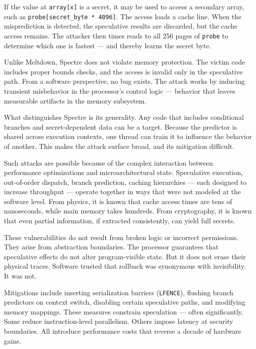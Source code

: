 If the value at \texttt{array[x]} is a secret, it may be used to access a secondary array, such as \texttt{probe[secret\_byte * 4096]}. The access loads a cache line. When the misprediction is detected, the speculative results are discarded, but the cache access remains. The attacker then times reads to all 256 pages of \texttt{probe} to determine which one is fastest — and thereby learns the secret byte.

Unlike Meltdown, Spectre does not violate memory protection. The victim code includes proper bounds checks, and the access is invalid only in the speculative path. From a software perspective, no bug exists. The attack works by inducing transient misbehavior in the processor’s control logic — behavior that leaves measurable artifacts in the memory subsystem.

What distinguishes Spectre is its generality. Any code that includes conditional branches and secret-dependent data can be a target. Because the predictor is shared across execution contexts, one thread can train it to influence the behavior of another. This makes the attack surface broad, and its mitigation difficult.

Such attacks are possible because of the complex interaction between performance optimizations and microarchitectural state. Speculative execution, out-of-order dispatch, branch prediction, caching hierarchies — each designed to increase throughput — operate together in ways that were not modeled at the software level. From physics, it is known that cache access times are tens of nanoseconds, while main memory takes hundreds. From cryptography, it is known that even partial information, if extracted consistently, can yield full secrets.

These vulnerabilities do not result from broken logic or incorrect permissions. They arise from abstraction boundaries. The processor guarantees that speculative effects do not alter program-visible state. But it does not erase their physical traces. Software trusted that rollback was synonymous with invisibility. It was not.

Mitigations include inserting serialization barriers (\texttt{LFENCE}), flushing branch predictors on context switch, disabling certain speculative paths, and modifying memory mappings. These measures constrain speculation — often significantly. Some reduce instruction-level parallelism. Others impose latency at security boundaries. All introduce performance costs that reverse a decade of hardware gains.

